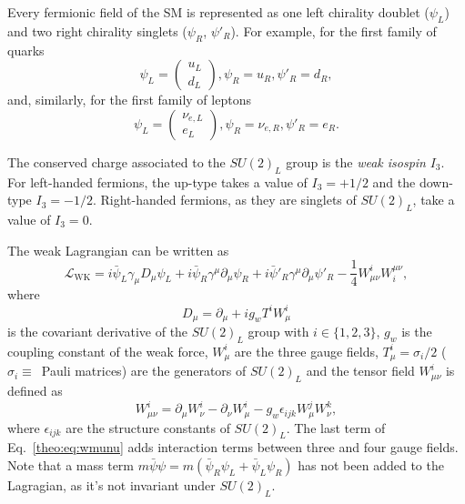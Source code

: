 \documentclass[../main.tex]{subfiles}
\begin{document}
Every fermionic field of the SM is represented as one left chirality doublet ($\psi_L$) and two right chirality singlets ($\psi_R$, $\psi'_R$). For example, for the first family of quarks
\begin{equation}
\psi_L = \left(
\begin{matrix}
u_L \\
d_L
\end{matrix}
\right), \psi_R = u_R, \psi'_R = d_R,
\end{equation}
and, similarly, for the first family of leptons
\begin{equation}
\label{theo:eq:ele_chiral}
\psi_L = \left(
\begin{matrix}
\nu_{e, L} \\
e_L
\end{matrix}
\right), \psi_R = \nu_{e,R}, \psi'_R = e_R.
\end{equation}

The conserved charge associated to the $SU(2)_L$ group is the \textit{weak isospin} $I_3$. For left-handed fermions, the up-type takes a value of $I_3=+1/2$ and the down-type $I_3=-1/2$. Right-handed fermions, as they are singlets of $SU(2)_L$, take a value of $I_3=0$.

The weak Lagrangian can be written as
\begin{equation}
\mathcal{L}_{\text{WK}} = i\bar{\psi}_L\gamma_\mu D_\mu \psi_L + i \bar{\psi}_R\gamma^\mu\partial_\mu\psi_R + i \bar{\psi}'_R\gamma^\mu\partial_\mu\psi'_R - \frac{1}{4}W_{\mu\nu}^i W_i^{\mu\nu},
\end{equation}
where
\begin{equation}
D_\mu = \partial_\mu + ig_w T^i W_\mu^i
\end{equation}
is the covariant derivative of the $SU(2)_L$ group with $i\in\{1, 2, 3\}$, $g_w$ is the coupling constant of the weak force, $W_\mu^i$ are the three gauge fields, $T_\mu^i = \sigma_i / 2$ ($\sigma_i\equiv$~Pauli matrices) are the generators of $SU(2)_L$ and the tensor field $W_{\mu\nu}^i$ is defined as
\begin{equation}
\label{theo:eq:wmunu}
W_{\mu\nu}^i = \partial_\mu W_\nu^i - \partial_\nu W_\mu^i - g_w \epsilon_{ijk}W_\mu^j W_\nu^k,
\end{equation}
where $\epsilon_{ijk}$ are the structure constants of $SU(2)_L$. The last term of Eq.~\eqref{theo:eq:wmunu} adds interaction terms between three and four gauge fields. Note that a mass term $m\bar{\psi}\psi = m(\bar{\psi}_R\psi_L + \bar{\psi}_L \psi_R)$ has not been added to the Lagragian, as it's not invariant under $SU(2)_L$.
\end{document}
